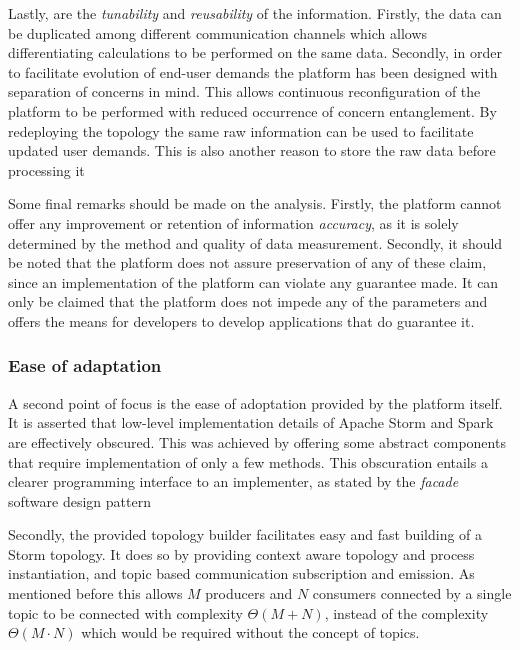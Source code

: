 Lastly, are the \emph{tunability} and \emph{reusability} of the information. Firstly, the data can be duplicated among different communication channels which allows differentiating calculations to be performed on the same data. Secondly, in order to facilitate evolution of end-user demands the platform has been designed with separation of concerns in mind. This allows continuous reconfiguration of the platform to be performed with reduced occurrence of concern entanglement. By redeploying the topology the same raw information can be used to facilitate updated user demands. This is also another reason to store the raw data before processing it

Some final remarks should be made on the analysis. Firstly, the platform cannot offer any improvement or retention of information \emph{accuracy}, as it is solely determined by the method and quality of data measurement. Secondly, it should be noted that the platform does not assure preservation of any of these claim, since an implementation of the platform can violate any guarantee made. It can only be claimed that the platform does not impede any of the parameters and offers the means for developers to develop applications that do guarantee it.

\subsubsection*{Ease of adaptation}
A second point of focus is the ease of adoptation provided by the platform itself. It is asserted that low-level implementation details of Apache Storm and Spark are effectively obscured. This was achieved by offering some abstract components that require implementation of only a few methods. This obscuration entails a clearer programming interface to an implementer, as stated by the \emph{facade} software design pattern \cite{facade_pattern}

Secondly, the provided topology builder facilitates easy and fast building of a Storm topology. It does so by providing context aware topology and process instantiation, and topic based communication subscription and emission.  As mentioned before this allows $M$ producers and $N$ consumers connected by a single topic to be connected with complexity $\Theta(M+N)$, instead of the complexity $\Theta(M\cdot N)$ which would be required without the concept of topics.


